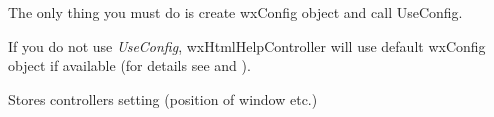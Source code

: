 The only thing you must do is create wxConfig object and call UseConfig.

If you do not use {\it UseConfig}, wxHtmlHelpController will use 
default wxConfig object if available (for details see 
 and 
).

\label{wxhtmlhelpcontrollerwritecustomization}


Stores controllers setting (position of window etc.)

